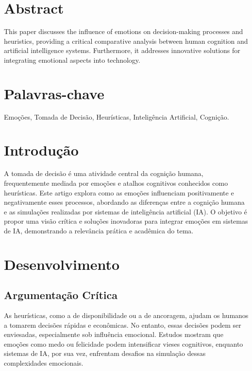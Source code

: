 \documentclass[a4paper,12pt]{report}
\begin{document}
	\section*{Abstract}
	This paper discusses the influence of emotions on decision-making processes and heuristics, providing a critical comparative analysis between human cognition and artificial intelligence systems. Furthermore, it addresses innovative solutions for integrating emotional aspects into technology.
	
	\section*{Palavras-chave}
	Emoções, Tomada de Decisão, Heurísticas, Inteligência Artificial, Cognição.
	
	\tableofcontents
	\newpage
	
	
	\section*{Introdução}
	A tomada de decisão é uma atividade central da cognição humana, frequentemente mediada por emoções e atalhos cognitivos conhecidos como heurísticas. Este artigo explora como as emoções influenciam positivamente e negativamente esses processos, abordando as diferenças entre a cognição humana e as simulações realizadas por sistemas de inteligência artificial (IA). O objetivo é propor uma visão crítica e soluções inovadoras para integrar emoções em sistemas de IA, demonstrando a relevância prática e acadêmica do tema.
	
	\section*{Desenvolvimento}
	\subsection*{Argumentação Crítica}
	As heurísticas, como a de disponibilidade ou a de ancoragem, ajudam os humanos a tomarem decisões rápidas e econômicas. No entanto, essas decisões podem ser enviesadas, especialmente sob influência emocional. Estudos mostram que emoções como medo ou felicidade podem intensificar vieses cognitivos, enquanto sistemas de IA, por sua vez, enfrentam desafios na simulação dessas complexidades emocionais.
	
\end{document}
